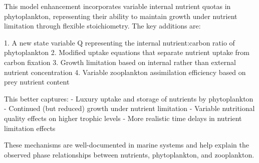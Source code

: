 This model enhancement incorporates variable internal nutrient quotas in phytoplankton, representing their ability to maintain growth under nutrient limitation through flexible stoichiometry. The key additions are:

1. A new state variable Q representing the internal nutrient:carbon ratio of phytoplankton
2. Modified uptake equations that separate nutrient uptake from carbon fixation
3. Growth limitation based on internal rather than external nutrient concentration
4. Variable zooplankton assimilation efficiency based on prey nutrient content

This better captures:
- Luxury uptake and storage of nutrients by phytoplankton
- Continued (but reduced) growth under nutrient limitation
- Variable nutritional quality effects on higher trophic levels
- More realistic time delays in nutrient limitation effects

These mechanisms are well-documented in marine systems and help explain the observed phase relationships between nutrients, phytoplankton, and zooplankton.
